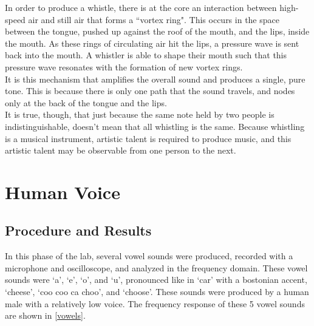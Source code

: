 \documentclass[aps,prl,reprint]{revtex4-2}
\begin{document}
In order to produce a whistle, there is at the core an interaction between
high-speed air and still air that forms a ``vortex ring". This occurs 
in the space between the tongue, pushed up against the roof of the mouth,
and the lips, inside the mouth. As these rings of circulating air hit the
lips, a pressure wave is sent back into the mouth. A whistler is able
to shape their mouth such that this pressure wave resonates with the 
formation of new vortex rings. \\

It is this mechanism that amplifies the overall sound and produces a single,
pure tone. This is because there is only one path that the sound travels,
and nodes only at the back of the tongue and the lips. \\

It is true, though, that just because the same note held by two people is
indistinguishable, doesn't mean that all whistling is the same. Because
whistling is a musical instrument, artistic talent is required to produce 
music, and this artistic talent may be observable from one person to the next.

\section{Human Voice}

\subsection{Procedure and Results}

In this phase of the lab, several vowel sounds were produced, recorded with
a microphone and oscilloscope, and analyzed in the frequency domain. These
vowel sounds were `a', `e', `o', and `u', pronounced like in `car' with
a bostonian accent, `cheese', `coo coo ca choo', and `choose'. These
sounds were produced by a human male with a relatively low voice. The frequency
response of these 5 vowel sounds are shown in \ref{vowels}.
\end{document}
